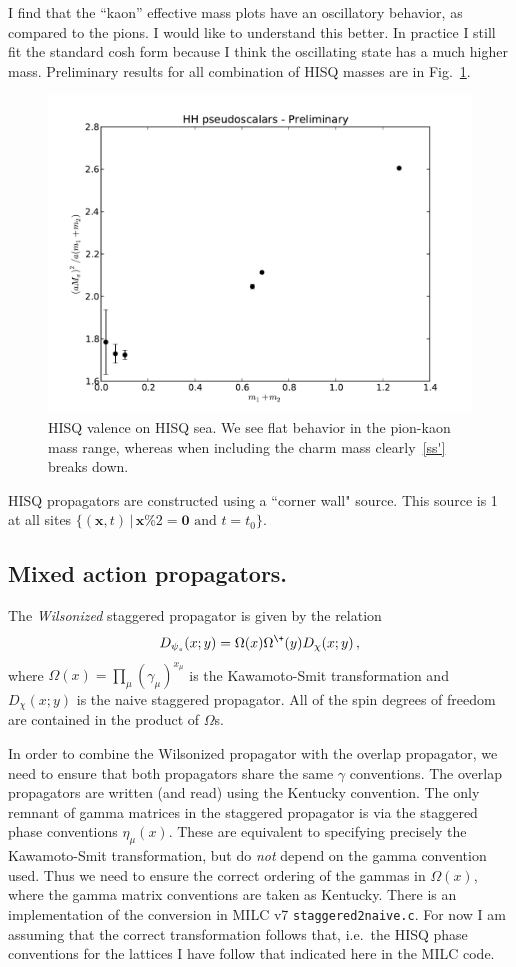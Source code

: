 \documentclass[11pt,a4paper]{article}
\begin{document}
I find that the ``kaon'' effective mass plots have an oscillatory behavior, as compared to 
the pions.  
I would like to understand this better.
In practice I still fit the standard cosh form because I think the oscillating state has a much higher mass. Preliminary results for all combination of HISQ masses are in Fig.~\ref{HH_pseudo}.%
\begin{figure}[h]
\centering
\includegraphics[width=.8\textwidth]{HH_pseudo}
\caption{HISQ valence on HISQ sea.  We see flat behavior in the pion-kaon mass range, whereas
when including the charm mass clearly~\ref{ss'} breaks down.}
\label{HH_pseudo}
\end{figure}

HISQ propagators are constructed using a ``corner wall" source.  This source is 1 at all sites
$\{ (\mathbf{x}, t) \, | \, \mathbf{x} \% 2 = \mathbf{0} \text{ and } t = t_0\}$.

\subsection{Mixed action propagators.}
The \emph{Wilsonized} staggered propagator is given by the relation
\begin{equation}
D_{\psi_s}(x;y) = \Omega(x) \Omega^{\+}(y) D_{\chi}(x;y) \,,
\end{equation}
where $\Omega(x) = \prod_{\mu} (\gamma_\mu)^{x_\mu}$ is the Kawamoto-Smit transformation
and $D_{\chi}(x;y)$ is the naive staggered propagator.
All of the spin degrees of freedom are contained in the product of $\Omega$s.

In order to combine the Wilsonized propagator with the overlap propagator,
we need to ensure that both propagators share the same $\gamma$ conventions.
The overlap propagators are written (and read) using the Kentucky convention.
The only remnant of gamma matrices in the staggered propagator is via the staggered
phase conventions $\eta_\mu(x)$.  
These are equivalent to specifying precisely the Kawamoto-Smit transformation,
but do \emph{not} depend on the gamma convention used.  
Thus we need to ensure the correct ordering of the gammas in $\Omega(x)$,
 where the gamma matrix conventions are taken as Kentucky.
 There is an implementation of the conversion in MILC v7 {\tt staggered2naive.c}.
 For now I am assuming that the correct transformation follows that, 
 i.e.\ the HISQ phase conventions for the lattices I have follow that indicated here in the MILC code.
 
\end{document}
